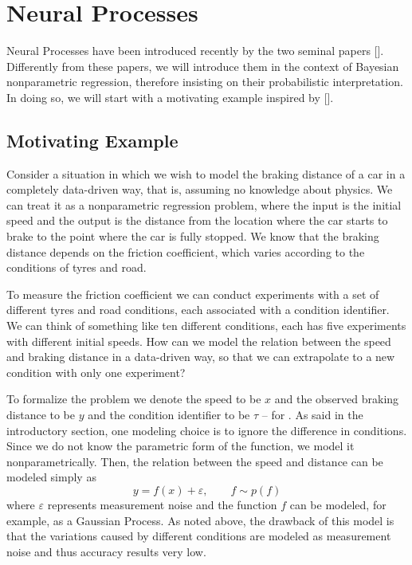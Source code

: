 \section{Neural Processes}
Neural Processes have been introduced recently by the two seminal papers [\cite{Garnelo2018a, Garnelo2018b}]. Differently from these papers, we will introduce them in the context of Bayesian nonparametric regression, therefore insisting on their probabilistic interpretation. In doing so, we will start with a motivating example inspired by [\cite{Dai2017a}].


\subsection{Motivating Example}
Consider a situation in which we wish to model the braking distance of a car in a completely data-driven way, that is, assuming no knowledge about physics. We can treat it as a nonparametric regression problem, where the input is the initial speed and the output is the distance from the location where the car starts to brake to the point where the car is fully stopped. We know that the braking distance depends on the friction coefficient, which varies according to the conditions of tyres and road. 

To measure the friction coefficient we can conduct experiments with a set of different tyres and road conditions, each associated with a condition identifier. We can think of something like ten different conditions, each has five experiments with different initial speeds. How can we model the relation between the speed and braking distance in a data-driven way, so that we can extrapolate to a new condition with only one experiment?

\bigbreak

To formalize the problem we denote the speed to be $x$ and the observed braking distance to be $y$ and the condition identifier to be $\tau$ -- for . As said in the introductory section, one modeling choice is to ignore the difference in conditions. Since we do not know the parametric form of the function, we model it nonparametrically. Then, the relation between the speed and distance can be modeled simply as
\begin{equation*}
    y = f(x) + \varepsilon, \qquad f\sim p(f)
\end{equation*}
where $\varepsilon$ represents measurement noise and the function $f$ can be modeled, for example, as a Gaussian Process. As noted above, the drawback of this model is that the variations caused by different conditions are modeled as measurement noise and thus accuracy results very low.

